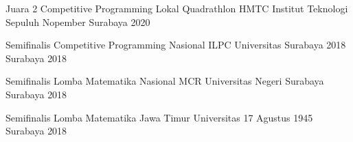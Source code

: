 



\begin{cvhonors}

  \cvhonor
    {Juara 2} %
    {Competitive Programming Lokal Quadrathlon HMTC Institut Teknologi Sepuluh Nopember} %
    {Surabaya} %
    {2020} %

  \cvhonor
    {Semifinalis} %
    {Competitive Programming Nasional ILPC Universitas Surabaya 2018} %
    {Surabaya} %
    {2018} %

  \cvhonor
    {Semifinalis} %
    {Lomba Matematika Nasional MCR Universitas Negeri Surabaya} %
    {Surabaya} %
    {2018} %

  \cvhonor
    {Semifinalis} %
    {Lomba Matematika Jawa Timur Universitas 17 Agustus 1945} %
    {Surabaya} %
    {2018} %

\end{cvhonors}








